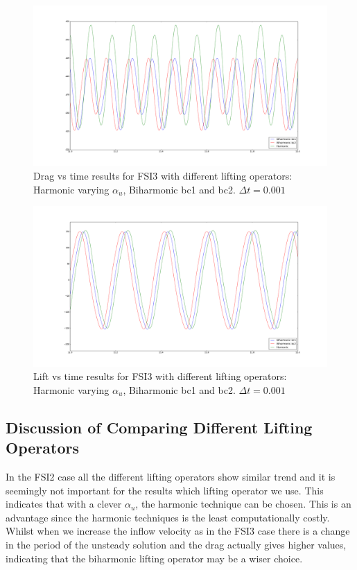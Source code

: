 \begin{figure}[H]
    \centering
    \includegraphics[trim={3cm 3cm 3cm 3cm},scale=0.20]{./Mesh_motion_results/FSI3_dt0001_Drag.png} 
    \caption{Drag vs time results for FSI3 with different lifting operators: Harmonic varying $\alpha_u$, Biharmonic bc1 and bc2. $\Delta t = 0.001$}
    \label{FSI33}
\end{figure}
\begin{figure}[H]
    \centering
    \includegraphics[trim={3cm 3cm 3cm 3cm},scale=0.20]{./Mesh_motion_results/FSI3_dt0001_Lift.png} 
    \caption{Lift vs time results for FSI3 with different lifting operators: Harmonic varying $\alpha_u$, Biharmonic bc1 and bc2. $\Delta t = 0.001$}
    \label{FSI34}
\end{figure}

\subsection*{Discussion of Comparing Different Lifting Operators}
In the FSI2 case all the different lifting operators show similar trend and it is seemingly not important for the results which lifting operator we use. This indicates that with a clever $\alpha_u$, the harmonic technique can be chosen. This is an advantage since the harmonic techniques is the least computationally costly. Whilst when we increase the inflow velocity as in the FSI3 case there is a change in the period of the unsteady solution and the drag actually gives higher values, indicating that the biharmonic lifting operator may be a wiser choice.

